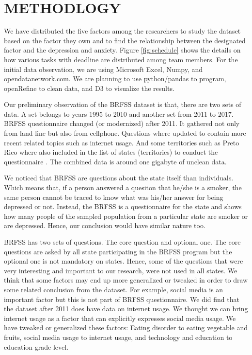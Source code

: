 \documentclass[letterpaper, 10 pt, conference]{ieeeconf}  %
\begin{document}
\section{METHODLOGY}
We have distributed the five factors among the researchers to study the dataset based on the factor they 
own and to find the relationship between the designated factor and the depression and anxiety.
Figure \ref{fig:schedule} shows the details on how various tasks with deadline are distributed among team members.
For the initial data observation, we are using Microsoft Excel, Numpy\cite{numpy}, and opendatanetwork.com\cite{odn}.
We are planning to use python/pandas\cite{pandas} to program, openRefine\cite{openrefine} to clean 
data, and D3\cite{d3} to visualize the results.

Our preliminary observation of the BRFSS\cite{brfss} dataset is that, there are two sets of data. 
A set belongs to years 1995 to 2010 and another set from 2011 to 2017. 
BRFSS questionnaire 
changed (or modernized) after 2011. It gathered not only from land line but also from cellphone. 
Questions where updated to contain more recent related topics such as internet usage. 
And some territories such as Preto Rico where also included in the list of states (territories) 
to conduct the questionnaire \cite{brfss}. 
The combined data is around one gigabyte of unclean data. 

We noticed that BRFSS are questions about the state itself than individuals. 
Which means that, if a person answered a quesiton that he/she is a smoker, the same person cannot be traced to know
what was his/her answer for being depressed or not. 
Instead, the BRFSS is a questionnaire for the state and shows how many people of the sampled population 
from a particular state are smoker or are depressed. Hence, our conclusion would have similar nature too. 

BRFSS has two sets of questions. The core question and optional one. The core questions are asked by 
all state participating in the BRFSS program but the optional one is not mandatory on states. Hence, 
some of the questions that were very interesting and important to our research, were not used in all states. 
We think that some factors may end up more generalized or tweaked in order to draw some related conclusion
from the dataset. 
For example, social media is an important factor but this is not part of BRFSS questionnaire. 
We did find that the dataset after 2011 does have data on internet usage. We thought we can bring internet 
usage as a factor that can explicitly expresses social media usage. We have tweaked or generalized these factors:
Eating disorder to eating vegetable and fruits, social media usage to internet usage, and technology and 
education to education grade level.
\end{document}
